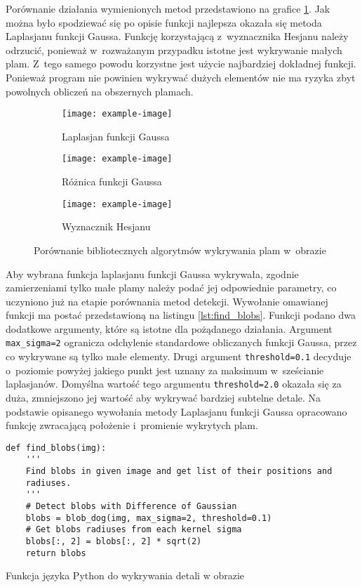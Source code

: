Porównanie działania wymienionych metod przedstawiono na grafice
\ref{fig:blobcompare}.
Jak można było spodziewać się po opisie funkcji najlepsza okazała się metoda
Laplasjanu funkcji Gaussa.
Funkcję korzystającą z~wyznacznika Hesjanu należy odrzucić, ponieważ
w~rozważanym przypadku istotne jest wykrywanie małych plam.
Z~tego samego powodu korzystne jest użycie najbardziej dokładnej funkcji.
Ponieważ program nie powinien wykrywać dużych elementów nie ma ryzyka zbyt
powolnych obliczeń na obszernych plamach.
\begin{figure}[htbp]
	\centering
	\begin{subfigure}[t]{0.3\textwidth}
		\centering
		\texttt{[image: example-image]}
		\caption{Laplasjan funkcji Gaussa}
	\end{subfigure}
	\hspace{0.25cm}
	\centering
	\begin{subfigure}[t]{0.3\textwidth}
		\centering
		\texttt{[image: example-image]}
		\caption{Różnica funkcji Gaussa}
	\end{subfigure}
	\hspace{0.25cm}
	\begin{subfigure}[t]{0.3\textwidth}
		\centering
		\texttt{[image: example-image]}
		\caption{Wyznacznik Hesjanu}
	\end{subfigure}
	\caption{Porównanie bibliotecznych algorytmów wykrywania plam w~obrazie}
	\label{fig:blobcompare}
\end{figure}

Aby wybrana funkcja laplasjanu funkcji Gaussa wykrywała, zgodnie
zamierzeniami tylko małe plamy należy podać jej odpowiednie parametry,
co uczyniono już na etapie porównania metod detekcji.
Wywołanie omawianej funkcji ma postać przedstawioną na listingu
\ref{lst:find_blobs}.
Funkcji podano dwa dodatkowe argumenty, które są istotne dla pożądanego
działania.
Argument \texttt{max_sigma=2} ogranicza odchylenie standardowe
obliczanych funkcji Gaussa, przez co wykrywane są tylko małe elementy.
Drugi argument \texttt{threshold=0.1} decyduje o~poziomie
powyżej jakiego punkt jest uznany za maksimum w~sześcianie laplasjanów.
Domyślna wartość tego argumentu \texttt{threshold=2.0} okazała 
się za duża, zmniejszono jej wartość aby wykrywać bardziej subtelne detale.
Na podstawie opisanego wywołania metody Laplasjanu funkcji Gaussa
opracowano funkcję zwracającą położenie i~promienie wykrytych plam.
\begin{listing}[htbp]
\begin{verbatim}
def find_blobs(img):
    '''
    Find blobs in given image and get list of their positions and 
    radiuses.
    '''
    # Detect blobs with Difference of Gaussian
    blobs = blob_dog(img, max_sigma=2, threshold=0.1)
    # Get blobs radiuses from each kernel sigma
    blobs[:, 2] = blobs[:, 2] * sqrt(2)
    return blobs
\end{verbatim}
\caption{Funkcja języka Python do wykrywania detali w obrazie}
\label{lst:find_blobs}
\end{listing}

